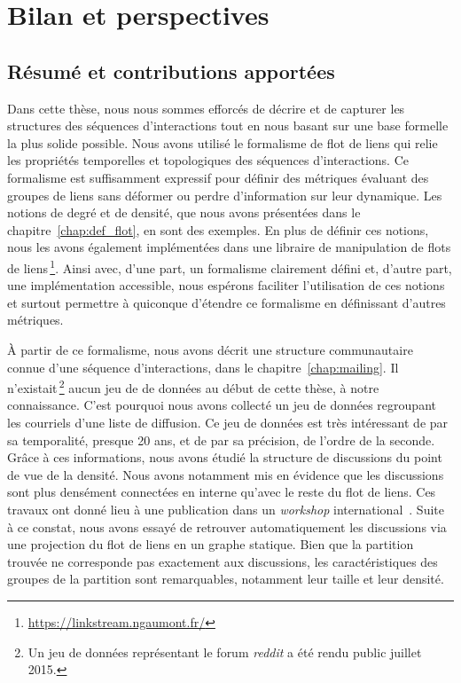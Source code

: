 \chapter{Bilan et perspectives}
\label{Conclusion}

\section{Résumé et contributions apportées}

Dans cette thèse, nous nous sommes efforcés de décrire et de capturer les structures des séquences d'interactions tout en nous basant sur une base formelle la plus solide possible.
Nous avons utilisé le formalisme de flot de liens qui relie les propriétés temporelles et topologiques des séquences d'interactions.
Ce formalisme est suffisamment expressif pour définir des métriques évaluant des groupes de liens sans déformer ou perdre d'information sur leur dynamique.
Les notions de degré et de densité, que nous avons présentées dans le chapitre~\ref{chap:def_flot}, en sont des exemples.
En plus de définir ces notions, nous les avons également implémentées dans une libraire de manipulation de flots de liens\,\footnote{\url{https://linkstream.ngaumont.fr/}}.
Ainsi avec, d'une part, un formalisme clairement défini et, d'autre part, une implémentation accessible, nous espérons faciliter l'utilisation de ces notions et surtout permettre à quiconque d'étendre ce formalisme en définissant d'autres métriques.

\`A partir de ce formalisme, nous avons décrit une structure communautaire connue d'une séquence d'interactions, dans le chapitre~\ref{chap:mailing}.
Il n'existait\,\footnote{Un jeu de données représentant le forum \emph{reddit} a été rendu public juillet 2015.} aucun jeu de de données au début de cette thèse, à notre connaissance.
C'est pourquoi nous avons collecté un jeu de données regroupant les courriels d'une liste de diffusion.
Ce jeu de données est très intéressant de par sa temporalité, presque 20 ans, et de par sa précision, de l'ordre de la seconde.
Grâce à ces informations, nous avons étudié la structure de discussions du point de vue de la densité.
Nous avons notamment mis en évidence que les discussions sont plus densément connectées en interne qu'avec le reste du flot de liens.
Ces travaux ont donné lieu à une publication dans un \emph{workshop} international~\cite{Gaumont2016}.
Suite à ce constat, nous avons essayé de retrouver automatiquement les discussions via une projection du flot de liens en un graphe statique.
Bien que la partition trouvée ne corresponde pas exactement aux discussions, les caractéristiques des groupes de la partition sont remarquables, notamment leur taille et leur densité.



